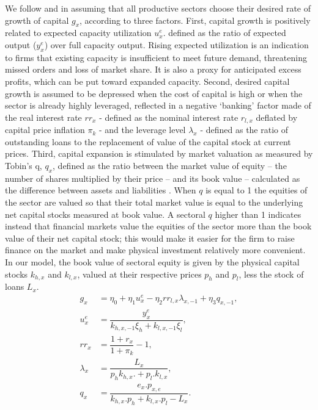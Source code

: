 \documentclass[authoryear]{article}
\begin{document}
We follow \citet{Fazzari1986} and \citet{Caiani2014} in assuming that all productive sectors choose their desired rate of growth of capital $g_{x}$, according to three factors. First, capital growth is positively related to expected capacity utilization $u_x^e$. defined as the ratio of expected output ($y_x^e$) over full capacity output. Rising expected utilization is an indication to firms that existing capacity is insufficient to meet future demand, threatening missed orders and loss of market share. It is also a proxy for anticipated excess profits, which can be put toward expanded capacity. Second, desired capital growth is assumed to be depressed when the cost of capital is high or when the sector is already highly leveraged, reflected in a negative `banking' factor made of the real interest rate $rr_{x}$ - defined as the nominal interest rate $r_{l,x}$ deflated by capital price inflation $\pi_k$ - and the leverage level $\lambda_x$ - defined as the ratio of outstanding loans to the replacement of value of the capital stock at current prices. Third, capital expansion is stimulated by market valuation as measured by Tobin's q, $q_x$, defined as the ratio between the market value of equity – the number of shares multiplied by their price – and its book value – calculated as the difference between assets and liabilities \citep{Tobin1969}. When $q$ is equal to 1 the equities of the sector are valued so that their total market value is equal to the underlying net capital stocks measured at book value. A sectoral $q$ higher than 1 indicates instead that financial markets value the equities of the sector more than the book value of their net capital stock; this would make it easier for the firm to raise finance on the market and make physical investment relatively more convenient. In our model, the book value of sectoral equity is given by the physical capital stocks $k_{h,x}$ and $k_{l,x}$, valued at their respective prices $p_h$ and $p_l$, less the stock of loans $L_x$.
\begin{align}
g_{x}&=\eta_{0} + \eta_{1} u_x^e-\eta_{2} rr_{l,x} \lambda_{x,-1}+\eta_3 q_{x,-1}, \label{eq:gx}\\
u_x^e&=\dfrac{y_x^e}{k_{h, x,-1}\xi_h+k_{l, x,-1}\xi_l},\\
rr_x&=\dfrac{1+r_x}{1+\pi_k}-1,\\
\lambda_x&=\dfrac{L_x}{p_hk_{h,x}. +p_l.k_{l,x}},\\
q_x&=\dfrac{e_x.p_{x,e}}{k_{h,x}.p_h+k_{l,x}.p_l-L_x}.
\end{align}
\end{document}
